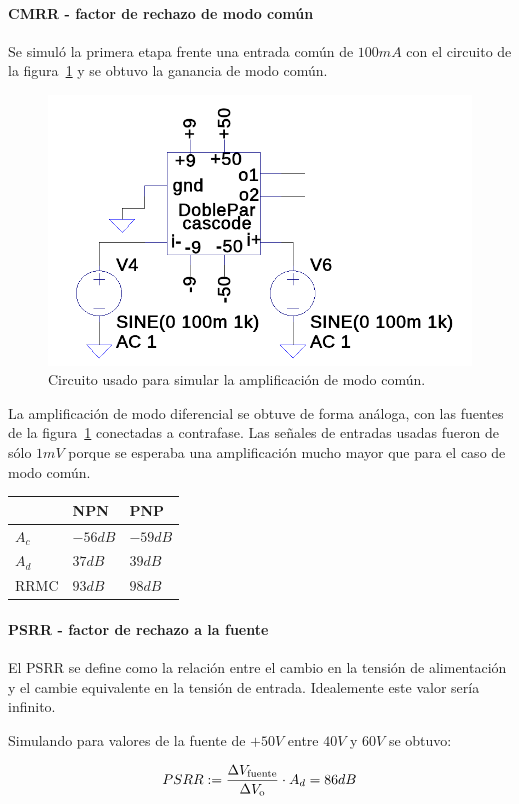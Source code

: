 \documentclass[a4paper,12pt,twoside]{article}
\begin{document}
\paragraph{CMRR - factor de rechazo de modo común}

Se simuló la primera etapa frente una entrada común de $100mA$ con el circuito de la figura~\ref{fig:ac} y se obtuvo la ganancia de modo común.


\begin{figure}[H]
	\centering
	\includegraphics[height=0.2\textwidth]{img/sim/ac}
	\caption{Circuito usado para simular la amplificación de modo común.}
	\label{fig:ac}
\end{figure}


La amplificación de modo diferencial se obtuve de forma análoga, con las fuentes de la figura~\ref{fig:ac} conectadas a contrafase. Las señales de entradas usadas fueron de sólo $1mV$ porque se esperaba una amplificación mucho mayor que para el caso de modo común. 

\begin{table}[H]
\centering
\begin{tabular}{l|ll}
 & NPN & PNP \\ \hline
$A_c$ & $-56dB$ & $-59dB$  \\
$A_d$ & $37dB$ & $39dB$  \\
RRMC & $93dB$ & $98dB$  
\end{tabular}
\end{table}

\paragraph{PSRR - factor de rechazo a la fuente}

El PSRR se define como la relación entre el cambio en la tensión de alimentación y el cambie equivalente en la tensión de entrada. Idealemente este valor sería infinito.

Simulando para valores de la fuente de $+50V$ entre $40V$ y $60V$ se obtuvo:

\[ PSRR := {\Delta V_\mathrm{fuente} \over {\Delta V_\mathrm{o}}} \cdot A_d = 86dB \]
\end{document}

